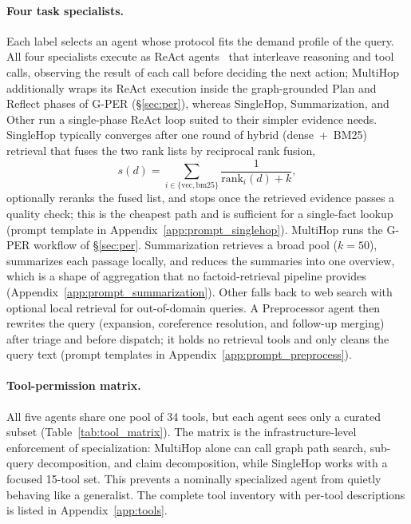 \documentclass[11pt,a4paper]{article}
\begin{document}
\paragraph{Four task specialists.}
Each label selects an agent whose protocol fits the demand profile of the query.
All four specialists execute as ReAct agents~\citep{yao2023react} that interleave reasoning and tool calls, observing the result of each call before deciding the next action; MultiHop additionally wraps its ReAct execution inside the graph-grounded Plan and Reflect phases of G-PER (\S\ref{sec:per}), whereas SingleHop, Summarization, and Other run a single-phase ReAct loop suited to their simpler evidence needs.
SingleHop typically converges after one round of hybrid (dense~+~BM25) retrieval that fuses the two rank lists by reciprocal rank fusion,
\begin{equation}
s(d)=\sum_{i\in\{\text{vec},\text{bm25}\}}\frac{1}{\mathrm{rank}_{i}(d)+k},
\label{eq:rrf}
\end{equation}
optionally reranks the fused list, and stops once the retrieved evidence passes a quality check; this is the cheapest path and is sufficient for a single-fact lookup (prompt template in Appendix~\ref{app:prompt_singlehop}).
MultiHop runs the G-PER workflow of \S\ref{sec:per}.
Summarization retrieves a broad pool ($k\!=\!50$), summarizes each passage locally, and reduces the summaries into one overview, which is a shape of aggregation that no factoid-retrieval pipeline provides (Appendix~\ref{app:prompt_summarization}).
Other falls back to web search with optional local retrieval for out-of-domain queries.
A Preprocessor agent then rewrites the query (expansion, coreference resolution, and follow-up merging) after triage and before dispatch; it holds no retrieval tools and only cleans the query text (prompt templates in Appendix~\ref{app:prompt_preprocess}).

\paragraph{Tool-permission matrix.}
All five agents share one pool of 34 tools, but each agent sees only a curated subset (Table~\ref{tab:tool_matrix}).
The matrix is the infrastructure-level enforcement of specialization: MultiHop alone can call graph path search, sub-query decomposition, and claim decomposition, while SingleHop works with a focused 15-tool set.
This prevents a nominally specialized agent from quietly behaving like a generalist.
The complete tool inventory with per-tool descriptions is listed in Appendix~\ref{app:tools}.
\end{document}
